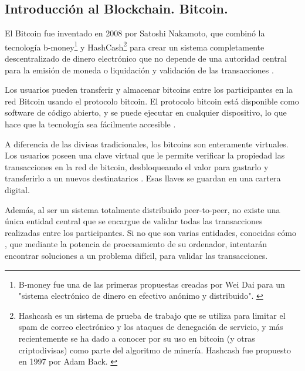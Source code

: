 \newpage

\subsection{Introducción al Blockchain. Bitcoin.}

El Bitcoin fue inventado en 2008 por Satoshi Nakamoto, que combinó la tecnología b-money\footnote{B-money 
fue una de las primeras propuestas creadas por Wei Dai para un "sistema electrónico de dinero en efectivo anónimo y 
distribuido". \label{fnlabel}} y HashCash\footnote{Hashcash es un sistema de prueba de trabajo que se utiliza para 
limitar el spam de correo electrónico y los ataques de denegación de servicio, y más recientemente se ha dado a 
conocer por su uso en bitcoin (y otras criptodivisas) como parte del algoritmo de minería. Hashcash fue propuesto 
en 1997 por Adam Back. \label{fnlabel}} para crear un sistema completamente descentralizado de dinero  electrónico 
que no depende de una autoridad central para la emisión de moneda o liquidación y validación de las transacciones 
\cite{antonopoulos2014mastering, bmoney, hashcash}.

\vspace{5mm}

\noindent Los usuarios pueden transferir y almacenar bitcoins entre los participantes en la red Bitcoin usando el 
protocolo bitcoin. El protocolo bitcoin está disponible como software de código abierto, y se puede ejecutar en 
cualquier dispositivo, lo que hace que la tecnología sea fácilmente accesible \cite{antonopoulos2014mastering}.

\vspace{5mm}

\noindent A diferencia de las divisas tradicionales, los bitcoins son enteramente virtuales. Los usuarios poseen una 
clave virtual que le permite verificar la propiedad las transacciones en la red de bitcoin, desbloqueando el valor para 
gastarlo y transferirlo a un nuevos destinatarios \cite{antonopoulos2014mastering}. Esas llaves se guardan en una 
cartera digital. 

\vspace{5mm}

\noindent Además, al ser un sistema totalmente distribuido peer-to-peer, no existe una única entidad central que se 
encargue de validar todas las transacciones realizadas entre los participantes. Si no que son varias entidades, 
conocidas cómo , que mediante la potencia de procesamiento de su ordenador, intentarán encontrar 
soluciones a un problema difícil, para validar las transacciones.

